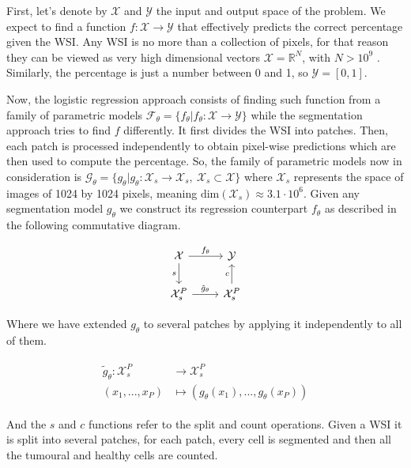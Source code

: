 First, let's denote by $\mathcal{X}$ and $\mathcal{Y}$ the input and output space of the problem. We expect to find a function $f : \mathcal{X} \to \mathcal{Y}$ that effectively predicts the correct percentage given the WSI. Any WSI is no more than a collection of pixels, for that reason they can be viewed as very high dimensional vectors $\mathcal{X} = \mathbb{R}^N$, with $N > 10^{9}$ \cite{DICOM}. Similarly, the percentage is just a number between 0 and 1, so $\mathcal{Y} = [0,1]$.

Now, the logistic regression approach consists of finding such function from a family of parametric models $\mathcal{F}_\theta = \{ f_\theta | f_\theta : \mathcal{X} \to \mathcal{Y} \}$ while the segmentation approach tries to find $f$ differently. It first divides the WSI into patches. Then, each patch is processed independently to obtain pixel-wise predictions which are then used to compute the percentage. So, the family of parametric models now in consideration is $\mathcal{G}_\theta = \{ g_\theta | g_\theta : \mathcal{X}_s \to \mathcal{X}_s,\ \mathcal{X}_s \subset \mathcal{X} \}$ where $\mathcal{X}_s$ represents the space of images of 1024 by 1024 pixels, meaning $\text{dim}(\mathcal{X}_s) \approx 3.1 \cdot 10^6$. Given any segmentation model $g_\theta$ we construct its regression counterpart $f_\theta$ as described in the following commutative diagram. 

\[ \begin{tikzcd}
\mathcal{X} \arrow{r}{f_\theta} \arrow[swap]{d}{s} & \mathcal{Y} \\%
\mathcal{X}_s^P \arrow{r}{\tilde{g}_\theta}& \mathcal{X}_s^P \arrow{u}{c}
\end{tikzcd}
\]

Where we have extended $g_\theta$ to several patches by applying it independently to all of them.

\begin{align}
\begin{split}
\tilde{g}_\theta : \mathcal{X}_s^P& \to \mathcal{X}_s^P\\
(x_1, ..., x_P)& \mapsto (g_\theta(x_1), ..., g_\theta(x_P))
\end{split}
\end{align}

And the $s$ and $c$ functions refer to the split and count operations. Given a WSI it is split into several patches, for each patch, every cell is segmented and then all the tumoural and healthy cells are counted.

